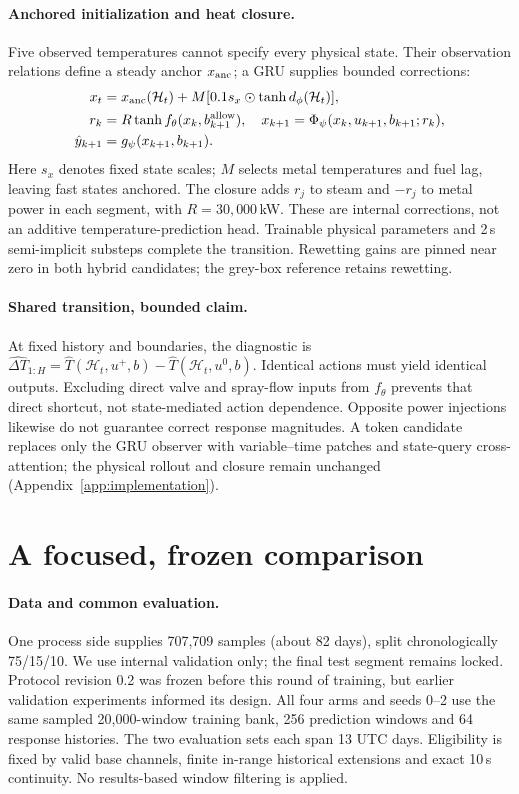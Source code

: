 \documentclass{article}
\begin{document}
\paragraph{Anchored initialization and heat closure.}
Five observed temperatures cannot specify every physical state. Their observation
relations define a steady anchor $x_{\rm anc}$; a GRU supplies bounded corrections:
\begin{align}
x_t &= x_{\rm anc}(\mathcal H_t)+M[0.1s_x\odot\tanh d_\phi(\mathcal H_t)],\label{eq:init}\\
r_k &= R\tanh f_\theta(x_k,b_{k+1}^{\rm allow}),\quad
x_{k+1}=\Phi_\psi(x_k,u_{k+1},b_{k+1};r_k),\label{eq:trans}\\
\hat y_{k+1}&=g_\psi(x_{k+1},b_{k+1}).\label{eq:obs}
\end{align}
Here $s_x$ denotes fixed state scales; $M$ selects metal temperatures and fuel lag,
leaving fast states anchored. The closure adds $r_j$ to steam and $-r_j$ to metal
power in each segment, with $R=30{,}000$\,kW. These are internal corrections, not
an additive temperature-prediction head. Trainable physical parameters and
2\,s semi-implicit substeps complete the transition. Rewetting gains are pinned
near zero in both hybrid candidates; the grey-box reference retains rewetting.

\paragraph{Shared transition, bounded claim.}
At fixed history and boundaries, the diagnostic is
$\widehat{\Delta T}_{1:H}=\hat T(\mathcal H_t,u^+,b)-\hat T(\mathcal H_t,u^0,b)$.
Identical actions must yield identical outputs. Excluding direct valve and
spray-flow inputs from $f_\theta$ prevents that direct shortcut, not state-mediated
action dependence. Opposite power injections likewise do not guarantee correct
response magnitudes. A token candidate replaces only the GRU observer with
variable--time patches and state-query cross-attention; the physical rollout
and closure remain unchanged (Appendix~\ref{app:implementation}).

\clearpage
\section{A focused, frozen comparison}\label{sec:protocol}

\paragraph{Data and common evaluation.}
One process side supplies 707,709 samples (about 82 days), split chronologically
75/15/10. We use internal validation only; the final test segment remains locked.
Protocol revision 0.2 was frozen before this round of training, but earlier
validation experiments informed its design. All four arms and seeds 0--2 use the
same sampled 20,000-window training bank, 256 prediction windows and 64 response
histories. The two evaluation sets each span 13 UTC days. Eligibility is fixed
by valid base channels, finite in-range historical extensions and exact 10\,s
continuity. No results-based window filtering is applied.
\end{document}

